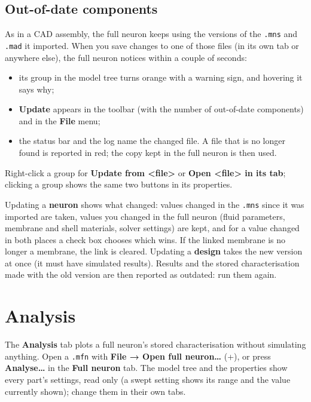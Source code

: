\documentclass[11pt,a4paper]{article}
\newcommand{\code}[1]{\texttt{#1}}
\newcommand{\menu}[1]{\textsf{\textbf{#1}}}
\newcommand{\key}[1]{\fbox{\footnotesize\textsf{#1}}}
\begin{document}
\subsection{Out-of-date components}
\label{sec:outdated}

As in a CAD assembly, the full neuron keeps using the versions of the \code{.mns} and \code{.mad} it imported. When
you save changes to one of those files (in its own tab or anywhere else), the full neuron notices within a couple of
seconds:
\begin{itemize}
\item its group in the model tree turns orange with a warning sign, and hovering it says why;
\item \menu{Update} appears in the toolbar (with the number of out-of-date components) and in the \menu{File} menu;
\item the status bar and the log name the changed file. A file that is no longer found is reported in red; the copy
  kept in the full neuron is then used.
\end{itemize}
Right-click a group for \menu{Update from <file>} or \menu{Open <file> in its tab}; clicking a group shows the same
two buttons in its properties.

Updating a \textbf{neuron} shows what changed: values changed in the \code{.mns} since it was imported are taken,
values you changed in the full neuron (fluid parameters, membrane and shell materials, solver settings) are kept, and for a value changed in both
places a check box chooses which wins. If the linked membrane is no longer a membrane, the link is cleared. Updating
a \textbf{design} takes the new version at once (it must have simulated results). Results and the stored
characterisation made with the old version are then reported as outdated: run them again.

\section{Analysis}
\label{sec:analysis}

The \menu{Analysis} tab plots a full neuron's stored characterisation without simulating anything. Open a
\code{.mfn} with \menu{File → Open full neuron…} (\key{Ctrl}+\key{O}), or press \menu{Analyse…} in the
\menu{Full neuron} tab. The model tree and the properties show every part's settings, read only (a swept setting
shows its range and the value currently shown); change them in their own tabs.
\end{document}
